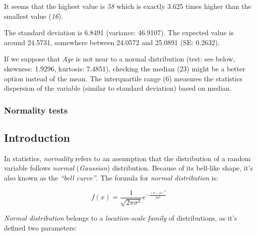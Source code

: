 \documentclass{article}
\begin{document}
It seems that the highest value is \emph{58} which is exactly 3.625
times higher than the smallest value (\emph{16}).

The standard deviation is 6.8491 (variance: 46.9107). The expected value
is around 24.5731, somewhere between 24.0572 and 25.0891 (SE: 0.2632).

If we suppose that \emph{Age} is not near to a normal distribution
(test: see below, skewness: 1.9296, kurtosis: 7.4851), checking the
median (23) might be a better option instead of the mean. The
interquartile range (6) measures the statistics dispersion of the
variable (similar to standard deviation) based on median.

\subsubsection{Normality tests}

\subsection{Introduction}

In statistics, \emph{normality} refers to an assumption that the
distribution of a random variable follows \emph{normal}
(\emph{Gaussian}) distribution. Because of its bell-like shape, it's
also known as the \emph{``bell curve''}. The formula for \emph{normal
distribution} is:

\[f(x) = \frac{1}{\sqrt{2\pi{}\sigma{}^2}} e^{-\frac{(x-\mu{})^2}{2\sigma{}^2}}\]

\emph{Normal distribution} belongs to a \emph{location-scale family} of
distributions, as it's defined two parameters:
\end{document}
